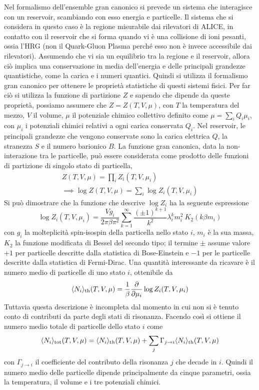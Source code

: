 Nel formalismo dell'ensemble gran canonico si prevede un sistema che interagisce con un reservoir, scambiando con esso energia e particelle.
Il sistema che si considera in questo caso è la regione misurabile dai rilevatori di ALICE, in contatto con il reservoir che si forma quando vi è una collisione di ioni pesanti, ossia l'HRG (non il Quark-Gluon Plasma perché esso non è invece accessibile dai rilevatori).
Assumendo che vi sia un equilibrio tra la regione e il reservoir, allora ciò implica una conservazione in media dell'energia e delle principali grandezze quantistiche, come la carica e i numeri quantici.
Quindi si utilizza il formalismo gran canonico per ottenere le proprietà statistiche di questi sistemi fisici.
Per far ciò si utilizza la funzione di partizione $Z$ e sapendo che dipende da queste proprietà, possiamo assumere che $Z = Z(T,V,\mu)$, con $T$ la temperatura del mezzo, $V$ il volume, $\mu$ il potenziale chimico collettivo definito come $\mu = \sum_iQ_i\mu_i$, con $\mu_i$ i potenziali chimici relativi a ogni carica conservata $Q_i$.
Nel reservoir, le principali grandezze che vengono conservate sono la carica elettrica $Q$, la stranezza $S$ e il numero barionico $B$.
La funzione gran canonica, data la non-interazione tra le particelle, può essere considerata come prodotto delle funzioni di partizione di singolo stato di particella,
\begin{gather}
    Z(T,V,\mu) = \prod_i Z_i(T,V,\mu_i)\\
    \implies \log Z(T,V,\mu)= \sum_i \log Z_i(T,V,\mu_i)
\end{gather}
Si può dimostrare che la funzione che descrive $\log Z_i$ ha la seguente espressione
\begin{equation}
    \log Z_i(T,V,\mu_i) = \dfrac{Vg_i}{2\pi\beta\pi^2}\sum_{k=1}^\infty \dfrac{(\pm 1)^{k+1}}{k^2}\lambda_i^k m_i^2 \ K_2(k\beta m_i) 
\end{equation}
con $g_i$ la molteplicità spin-isospin della particella nello stato $i$, $m_i$ è la sua massa, $K_2$ la funzione modificata di Bessel del secondo tipo; il termine $\pm$ assume valore $+1$ per particelle descritte dalla statistica di Bose-Einstein e $-1$ per le particelle descritte dalla statistica di Fermi-Dirac.
Una quantità interessante da ricavare è il numero medio di particelle di uno stato $i$, ottenibile da
\begin{equation}\label{eq:mean_n}
    \langle N_i \rangle_\text{th}(T,V,\mu) = \dfrac1\beta\dfrac{\partial }{\partial \mu_i} \log Z_i(T,V,\mu_i)
\end{equation}
Tuttavia questa descrizione è incompleta dal momento in cui non si è tenuto conto di contributi da parte degli stati di risonanza.
Facendo così si ottiene il numero medio totale di particelle dello stato $i$ come
\begin{equation}
    \langle N_i \rangle_\text{tot}(T,V,\mu) = \langle N_i \rangle_\text{th}(T,V,\mu) + \sum_j \Gamma_{j\to i}\langle N_i \rangle_\text{th}(T,V,\mu)
\end{equation}
con $\Gamma_{j\to i}$ il coefficiente del contributo della risonanza $j$ che decade in $i$.
Quindi il numero medio delle particelle dipende principalmente da cinque parametri, ossia la temperatura, il volume e i tre potenziali chimici.\\

